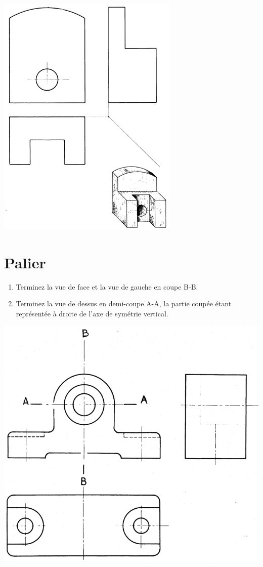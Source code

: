 \documentclass[11pt,oneside]{article}
\begin{document}
\begin{center}
\includegraphics[width=.6\textwidth]{png/fig2}
\end{center}

\newpage
\section*{Palier}

\begin{enumerate}
\item Terminez la vue de face et la vue de gauche en coupe B-B.
\item Terminez la vue de dessus en demi-coupe A-A, la partie coupée étant représentée à droite de l’axe de symétrie vertical.

\end{enumerate}

\begin{center}
\includegraphics[width=\textwidth]{png/fig3}
\end{center}
\end{document}
